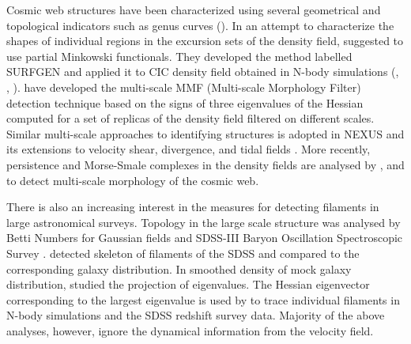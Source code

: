 Cosmic web structures have been characterized using several geometrical and topological indicators such as genus curves (\cite{Gott1986}). In an attempt to characterize the shapes of  individual regions in the excursion sets of the density field, \cite{Sahni1998} suggested to use partial Minkowski functionals. They developed the method labelled SURFGEN and applied it to CIC density field obtained in N-body simulations 
(\citealt{Sathyaprakash1998}, \citealt{Sheth2003}, \citealt{Shandarin2004}). \cite{Aragon-Calvo2007} have developed the multi-scale MMF (Multi-scale Morphology Filter) detection technique based on the signs of three eigenvalues of the Hessian computed for  a set of replicas of the density field filtered on different scales. Similar multi-scale approaches to identifying structures is adopted in NEXUS and its extensions to velocity shear, divergence, and tidal fields \cite{Cautun2013}. More recently, persistence and Morse-Smale complexes in the density fields are analysed by \cite{Sousbie2011f}, \cite{Sousbie2011e} and \cite{Shivshankar2015a} to detect multi-scale morphology of the cosmic web.


There is also an increasing interest in the measures for detecting filaments in large astronomical surveys. Topology in the large scale structure was analysed by Betti Numbers for Gaussian fields \citep{Park2013} and SDSS-III Baryon Oscillation Spectroscopic Survey \citep{Parihar2014}. \cite{Sousbie2008c} detected skeleton of filaments of the SDSS and compared to the corresponding galaxy distribution. In smoothed density of mock galaxy distribution, \cite{Bond2010a} studied the projection of eigenvalues. The Hessian eigenvector corresponding to the largest eigenvalue is used by \cite{Bond2010b} to trace individual filaments in N-body simulations and the SDSS redshift survey data. Majority of the above analyses, however, ignore the dynamical information from the velocity field.




